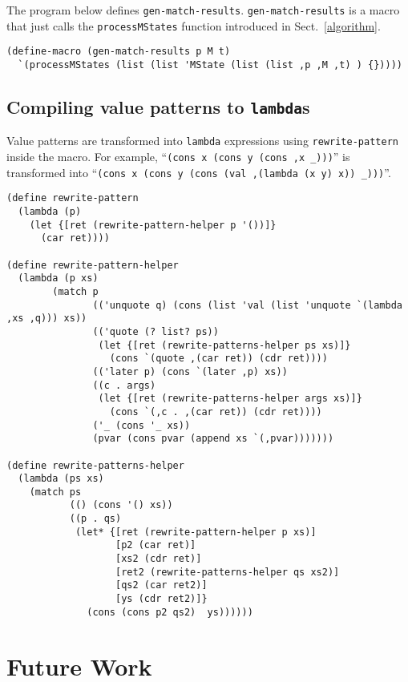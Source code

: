 \documentclass[acmlarge]{acmart}
\begin{document}
\noindent The program below defines \texttt{gen-match-results}.
\texttt{gen-match-results} is a macro that just calls the \texttt{processMStates} function introduced in Sect.~\ref{algorithm}.

\begin{lstlisting}[language=egison]
(define-macro (gen-match-results p M t)
  `(processMStates (list (list 'MState (list (list ,p ,M ,t) ) {}))))
\end{lstlisting}

\subsection{Compiling value patterns to \texttt{lambda}s}

Value patterns are transformed into \texttt{lambda} expressions using \texttt{rewrite-pattern} inside the macro.
For example, ``\texttt{(cons x (cons y (cons ,x _)))}'' is transformed into ``\texttt{(cons x (cons y (cons (val ,(lambda (x y) x)) _)))}''.

\begin{lstlisting}[language=egison]
(define rewrite-pattern
  (lambda (p)
    (let {[ret (rewrite-pattern-helper p '())]}
      (car ret))))

(define rewrite-pattern-helper
  (lambda (p xs)
        (match p
               (('unquote q) (cons (list 'val (list 'unquote `(lambda ,xs ,q))) xs))
               (('quote (? list? ps))
                (let {[ret (rewrite-patterns-helper ps xs)]}
                  (cons `(quote ,(car ret)) (cdr ret))))
               (('later p) (cons `(later ,p) xs))
               ((c . args)
                (let {[ret (rewrite-patterns-helper args xs)]}
                  (cons `(,c . ,(car ret)) (cdr ret))))
               ('_ (cons '_ xs))
               (pvar (cons pvar (append xs `(,pvar)))))))

(define rewrite-patterns-helper
  (lambda (ps xs)
    (match ps
           (() (cons '() xs))
           ((p . qs)
            (let* {[ret (rewrite-pattern-helper p xs)]
                   [p2 (car ret)]
                   [xs2 (cdr ret)]
                   [ret2 (rewrite-patterns-helper qs xs2)]
                   [qs2 (car ret2)]
                   [ys (cdr ret2)]}
              (cons (cons p2 qs2)  ys))))))
\end{lstlisting}


\section{Future Work}\label{future}
\end{document}
